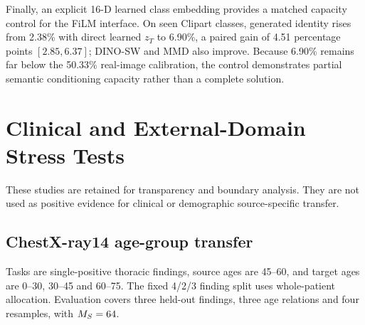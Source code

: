 Finally, an explicit 16-D learned class embedding provides a matched capacity control for the FiLM interface. On seen Clipart classes, generated identity rises from 2.38\% with direct learned $z_T$ to 6.90\%, a paired gain of 4.51 percentage points $[2.85,6.37]$; DINO-SW and MMD also improve. Because 6.90\% remains far below the 50.33\% real-image calibration, the control demonstrates partial semantic conditioning capacity rather than a complete solution.

\section{Clinical and External-Domain Stress Tests}
\label{app:clinical}
These studies are retained for transparency and boundary analysis. They are not used as positive evidence for clinical or demographic source-specific transfer.

\subsection{ChestX-ray14 age-group transfer}
Tasks are single-positive thoracic findings, source ages are 45--60, and target ages are 0--30, 30--45 and 60--75. The fixed 4/2/3 finding split uses whole-patient allocation. Evaluation covers three held-out findings, three age relations and four resamples, with $M_S=64$.

\begin{table}[h]
\centering\scriptsize
\caption{ChestX-ray14 SW route means. Lower is better. The independently reported wrong-minus-correct paired interval at $\KT=1$ is $7.7\times10^{-6}\pm2.3\times10^{-5}$; other displayed route differences lack paired covariance information.}
\end{table}

